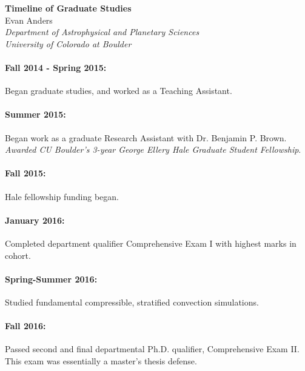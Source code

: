 \documentclass[aasms,12pt]{article}
\begin{document}
\begin{center}
   \large\textbf{Timeline of Graduate Studies}\\
   \vspace{0.4cm}
   \large{Evan Anders}\\
   \normalsize\textit{Department of Astrophysical and Planetary Sciences}\\
   \normalsize\textit{University of Colorado at Boulder}\\
\end{center}

\paragraph{Fall 2014 - Spring 2015:} Began graduate studies, and worked as a 
Teaching Assistant.
\vspace{-0.4cm}
\paragraph{Summer 2015:} Began work as a graduate Research Assistant with
	Dr. Benjamin P. Brown. \emph{Awarded CU Boulder's 3-year George Ellery Hale
	Graduate Student Fellowship}.

\vspace{-0.4cm}
\paragraph{Fall 2015:} Hale fellowship funding began.

\vspace{-0.4cm}
\paragraph{January 2016:} Completed department qualifier Comprehensive Exam I with
highest marks in cohort.

\vspace{-0.4cm}
\paragraph{Spring-Summer 2016:} Studied fundamental compressible, stratified convection
simulations.

\vspace{-0.4cm}
\paragraph{Fall 2016:} Passed second and final departmental Ph.D. qualifier, Comprehensive
Exam II. This exam was essentially a master's thesis defense.
\end{document}
